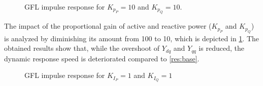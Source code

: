 \begin{figure}[ht]
\begin{center}
    \centering
   \nonindent
	\caption[GFL impulse response for $K_p_P=10$ and $K_p_Q=10$]{GFL impulse response for $K_p_P=10$ and $K_p_Q=10$.}
	\label{res:Kps(10)}
	\end{center}
\end{figure}

The impact of the proportional gain of active and reactive power ($K_p_P$ and $K_p_Q$) is analyzed by diminishing its amount from 100 to 10, which is depicted in \ref{res:Kps(10)}. The obtained results show that, while the overshoot of $Y_{dq}$ and $Y_{qq}$ is reduced, the dynamic response speed is deteriorated compared to \ref{res:base}.

\begin{figure}[ht]
\begin{center}
    \centering
   \nonindent
	\caption[GFL impulse response for $K_I_P=1$ and $K_I_Q=1$]{GFL impulse response for $K_I_P=1$ and $K_I_Q=1$}
	\label{res:KIs(1)}
	\end{center}
\end{figure}

